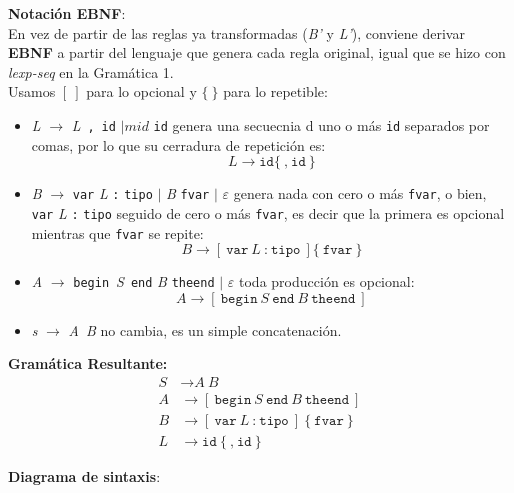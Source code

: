 \documentclass[12pt,letterpaper]{article}
\newcommand{\nt}[1]{\textit{#1}}
\newcommand{\tk}[1]{\texttt{#1}}
\newcommand{\eps}{\varepsilon}
\begin{document}
\begin{enumerate}[label=\arabic*.]
\begin{itemize}
    \medskip
    
    \textbf{\large Notación EBNF}:\\
    En vez de partir de las reglas ya transformadas (\nt{B'} y \nt{L'}), conviene derivar \textbf{EBNF} a partir
    del lenguaje que genera cada regla original, igual que se hizo con \nt{lexp-seq} en la Gramática 1.\\
    Usamos $[\ ]$ para lo opcional y $\{\ \}$ para lo repetible:

    \begin{itemize}[leftmargin=*]
    \item \nt{L} $\to$ \nt{L}\ \tk{,}\ \tk{id} $|mid$ \tk{id} genera una secuecnia d uno o más \tk{id} separados por comas, por lo que su cerradura de repetición es:
      \[
      \nt{L} \to \tk{id} \{\ \tk{,}\ \tk{id}\ \}
      \]

    \item \nt{B} $\to$ \tk{var} \nt{L} \tk{:} \tk{tipo} $\mid$ \nt{B} \tk{fvar} $\mid$ $\eps$ genera nada con cero o más \tk{fvar}, o bien, \tk{var} \nt{L} \tk{:} \tk{tipo} seguido de cero o más \tk{fvar}, es decir que la primera es opcional mientras que \tk{fvar} se repite:
      \[
      \nt{B} \to [\ \tk{var}\ \nt{L}\ \tk{:}\ \tk{tipo}\ ] \{\ \tk{fvar}\ \}
      \]
      
    \item \nt{A} $\to$ \tk{begin}\ \nt{S}\ \tk{end} \nt{B} \tk{theend} $\mid$ $\eps$ toda producción es opcional:
      \[
      \nt{A} \to [\ \tk{begin}\ \nt{S}\ \tk{end}\ \nt{B}\ \tk{theend}\ ]
      \]
      
    \item \nt{s} $\to$ \nt{A}\ \nt{B} no cambia, es un simple concatenación.
    \end{itemize}
    
    \textbf{Gramática Resultante:}
    \[
    \begin{aligned}
      \nt{S} &\to \nt{A}\ \nt{B} \\
      \nt{A} &\to [\ \tk{begin}\ \nt{S}\ \tk{end}\ \nt{B}\ \tk{theend}\ ] \\
      \nt{B} &\to [\ \tk{var}\ \nt{L}\ \tk{:}\ \tk{tipo}\ ]\ \{\ \tk{fvar}\ \} \\
      \nt{L} &\to \tk{id}\ \{\ \tk{,}\ \tk{id}\ \}
    \end{aligned}
    \]

    \newpage
    
    \textbf{\large Diagrama de sintaxis}:\\


\end{itemize}
\end{enumerate}
\end{document}

